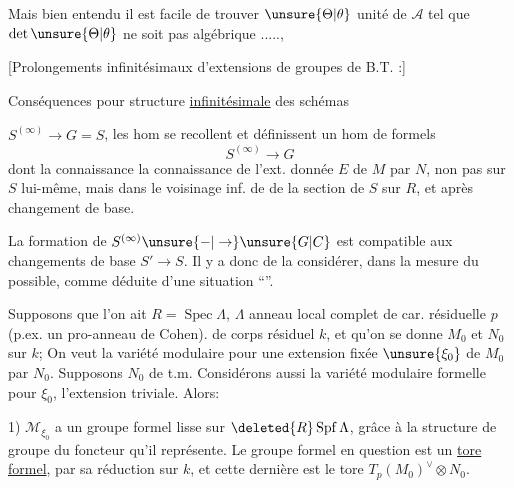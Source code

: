 

Mais bien entendu il est facile de trouver $\unsure{\Theta|\theta}$ unité de $\mathcal A$  tel que $\det\unsure{\Theta|\theta}$ ne soit pas algébrique .....,



[Prolongements infinitésimaux d'extensions de groupes de B.T. :]

Conséquences pour structure \uline{infinitésimale} des schémas 


$S^{(\infty)}\longrightarrow G=\widehat S$, les hom
 se recollent et définissent
un hom de  formels
\[
S^{(\infty)}\longrightarrow G
\]
dont la connaissance  
la connaissance de l'ext. donnée $E$ de $M$ par $N$, non pas
sur $S$ lui-même, mais dans le voisinage inf. de
 de la section de $S$ sur $R$, et
 après changement de base.


La formation de $S^{(\infty)}\unsure{-|\to}\unsure{G|C}$
est compatible aux changements de base 
$S'\longrightarrow S$. Il y a 
donc de la considérer, dans la mesure du possible, comme déduite
d'une situation ``''.

Supposons   que l'on
ait  $R=\operatorname{Spec}\Lambda$,
$\Lambda$ anneau local  complet de car.
résiduelle $p$ (p.ex. un pro-anneau de Cohen).
de corps résiduel $k$, et qu'on se donne $M_0$ et $N_0$
sur $k$; On veut la variété modulaire
pour une extension fixée $\unsure{\xi_0}$ de $M_0$ par $N_0$.
Supposons $N_0$ de t.m.
Considérons aussi la variété modulaire formelle pour $\xi_0$,
l'extension triviale.  Alors:

1) $\mathcal M_{\xi_0}$ a  un groupe formel
lisse sur $\deleted{R}\operatorname{Spf}\Lambda$,
grâce à la structure de groupe du foncteur qu'il représente.
Le groupe formel en question est un \uline{tore formel},
 
par sa réduction sur $k$, et cette dernière est le tore
 $T_p(M_0)^\vee\otimes N_0$.

